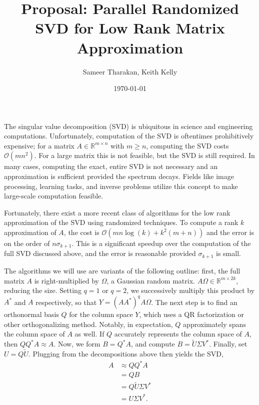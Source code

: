 \documentclass[a4paper]{article}
\title{Proposal: Parallel Randomized SVD for Low Rank Matrix Approximation}
\date{\today}
\author{Sameer Tharakan, Keith Kelly}
\begin{document}
\maketitle

The singular value decomposition (SVD) is ubiquitous in science and engineering computations. 
Unfortunately, computation of the SVD is oftentimes prohibitively expensive; for a matrix $A\in\mathbb{R}^{m \times n}$ with $m\geq n$, computing the SVD costs $\mathcal{O}(mn^2)$. \cite{golub2012matrix}
For a large matrix this is not feasible, but the SVD is still required. 
In many cases, computing the exact, entire SVD is not necessary and an approximation is sufficient provided the spectrum decays. 
Fields like image processing, learning tasks, and inverse problems utilize this concept to make large-scale computation feasible.

Fortunately, there exist a more recent class of algorithms for the low rank approximation of the SVD using randomized techniques.
To compute a rank $k$ approximation of $A$, the cost is $\mathcal{O}(mn\log(k) + k^2(m+n))$ and the error is on the order of $n\sigma_{k+1}$. \cite{halko2011finding}
This is a significant speedup over the computation of the full SVD discussed above, and the error is reasonable provided $\sigma_{k+1}$ is small.

The algorithms we will use are variants of the following outline: first, the full matrix $A$ is right-multiplied by $\Omega$, a Gaussian random matrix.
$A\Omega \in \mathbb{R}^{m \times 2k}$, reducing the size. 
Setting $q =1$ or $q = 2$, we successively multiply this product by $A^*$ and $A$ respectively, so that $Y = (A A^* ) ^q A \Omega$. 
The next step is to find an orthonormal basis $Q$ for the column space $Y$, which uses a QR factorization or other orthogonalizing method. 
Notably, in expectation, $Q$ approximately spans the column space of $A$ as well. \cite{witten2013randomized}
If $Q$ accurately represents the column space of $A$, then $QQ^*A \approx A$.
Now, we form $B = Q^* A$, and compute $B = \tilde{U} \Sigma V ^*$.
Finally, set $U = Q \tilde{U}$.
Plugging from the decompositions above then yields the SVD,
\begin{align*}
	A &\approx Q Q ^* A \\
	  & = Q B \\
		& = Q \tilde{U} \Sigma V^* \\
	  & = U \Sigma V^*.
\end{align*}
\end{document}
